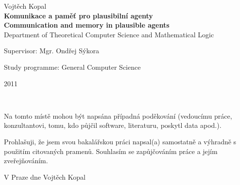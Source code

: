 \documentclass[12pt,a4paper]{report}
\begin{document}
\begin{titlepage}
\begin{center}
\vspace{15mm}

{\Large Vojtěch Kopal}\\ %
\vspace{5mm}
{\Large\bf Komunikace a pamě\v{t} pro plausibilní agenty}\\ %
\vspace{3mm}
{\Large\bf Communication and memory in plausible agents}\\ %
\vspace{5mm}
{\Large Department of Theoretical Computer Science and Mathematical Logic}\\
\end{center}
\vspace{10mm}

\large
\noindent Supervisor: Mgr. Ondřej Sýkora
\vspace{1mm} 

\noindent Study programme: General Computer Science

\vspace{10mm}

\begin{center}
2011
\end{center}

\end{titlepage} %

\normalsize %
\setcounter{page}{2} %
\ \vspace{10mm} 

\noindent Na tomto místě mohou být napsána případná poděkování (vedoucímu práce, konzultantovi, tomu, kdo půjčil software, literaturu, poskytl data apod.). %

\vspace{\fill} %
\noindent Prohlašuji, že jsem svou bakalářskou práci napsal(a) samostatně a výhradně s použitím citovaných pramenů. Souhlasím se zapůjčováním práce a jejím zveřejňováním.

\bigskip
\noindent V Praze dne \hspace{\fill}Vojtěch Kopal\\ %

\end{document}
